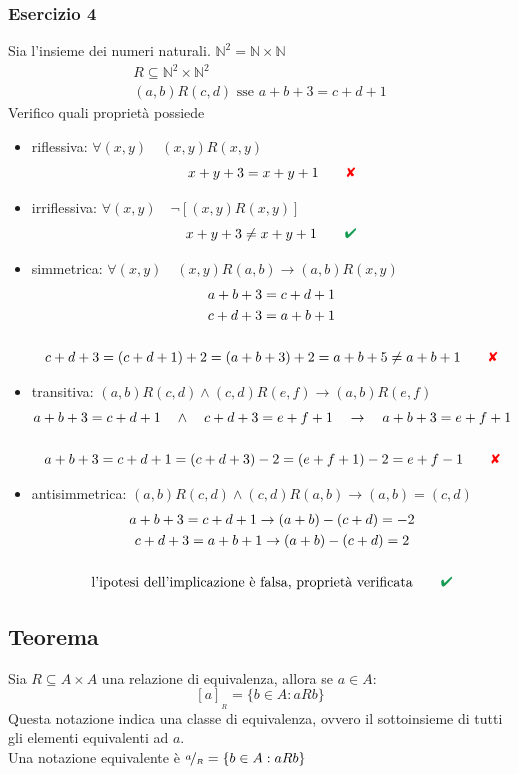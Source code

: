 \documentclass[italian]{article}
\newcommand{\crossmark}{\textcolor{red}{\text{$\qquad$\ding{56}}}}
\renewcommand{\checkmark}{\textcolor{ForestGreen}{\text{$\qquad$\ding{52}}}}
\newcommand{\ins}[1]{\text{$\mathbb{#1}$}}
\begin{document}
\subsubsection{Esercizio 4}
Sia \ins{N} l'insieme dei numeri naturali. $\ins{N}^2 = \ins{N} \times \ins{N}$
\begin{gather*}
	R \subseteq \ins{N}^2 \times \ins{N}^2\\
	(a,b)R(c,d) \text{ sse } a+b+3=c+d+1
\end{gather*}
Verifico quali proprietà possiede
\begin{itemize}
	\item riflessiva: $\forall(x,y) \quad (x,y)R(x,y)$
		\[
			x+y+3 = x + y + 1 \crossmark
		\]
	\item irriflessiva: $\forall(x,y) \quad \lnot\left[(x,y)R(x,y)\right]$
		\[
			x+y+3 \neq x + y + 1 \checkmark
		\]	
	\item simmetrica: $\forall(x,y) \quad (x,y)R(a,b) \to (a,b)R(x,y)$
		\begin{gather*}
			a+b+3 = c+d+1 \\
			c+d+3=a+b+1 \\\\
			c+d+3= (c+d+1)+2 = (a+b+3)+2 = a+b+5 \neq a+b+1 \crossmark
		\end{gather*}
	\item transitiva: $(a,b)R(c,d) \land (c,d)R(e,f) \to (a,b)R(e,f)$
		\begin{gather*}
			a+b+3 = c+d+1 \quad\land\quad c+d+3=e+f+1 \quad\to\quad a+b+3=e+f+1\\\\
			a+b+3=c+d+1 = (c+d+3)-2 = (e+f+1) - 2 = e + f -1 \crossmark
		\end{gather*}
	\item antisimmetrica:  $(a,b)R(c,d) \land (c,d)R(a,b) \to (a,b)=(c,d)$
		\begin{gather*}
				a+b+3=c+d+1 \to (a+b)-(c+d)=-2\\
				c+d+3=a+b+1 \to (a+b)-(c+d)=2\\\\
				\text{l'ipotesi dell'implicazione è falsa, proprietà verificata} \checkmark
		\end{gather*}
\end{itemize}


\subsection{Teorema}
Sia $R \subseteq A \times A$ una relazione di equivalenza, allora se $a \in A$:
\[
	[a]_{_R} = \{ b \in A : aRb \}
\]
Questa notazione indica una classe di equivalenza, ovvero il sottoinsieme di tutti gli elementi equivalenti ad $a$. \\
Una notazione equivalente è $\nicefrac{a}{_R} = \{ b \in A : aRb \}$ 
\end{document}
